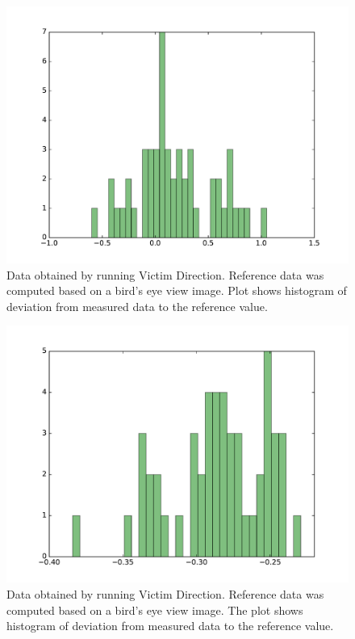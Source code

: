 \documentclass[a4paper,parskip,headheight=38pt]{scrartcl} %
\begin{document}
\begin{figure}[t]
\includegraphics[width=\textwidth]{victimdirectionbadplot.pdf}
\caption{Data obtained by running Victim Direction. Reference data was computed
based on a bird's eye view image. Plot shows histogram of deviation from
measured data to the reference value.}
\label{fig:vddatabad}
\end{figure}
\begin{figure}[t]
\includegraphics[width=\textwidth]{victimdirectiongoodplot.pdf}
\caption{Data obtained by running Victim Direction. Reference data was computed
based on a bird's eye view image. The plot shows histogram of deviation from
measured data to the reference value.}
\label{fig:vddatagood}
\end{figure}
\end{document}
